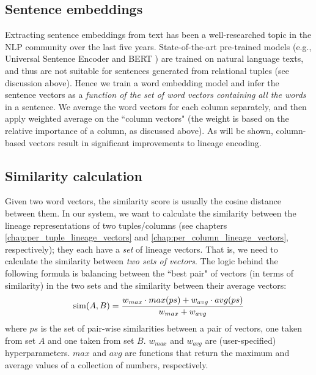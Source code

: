 \subsection{Sentence embeddings} Extracting sentence embeddings from text has been a well-researched topic in the NLP community over the last five years. State-of-the-art pre-trained models (e.g., Universal Sentence Encoder \cite{Cer2018UniversalSE, use_github} and BERT \cite{devlin2018bert}) are trained on natural language texts, and thus are not suitable for sentences generated from relational tuples (see discussion above). Hence we train a word embedding model and infer the sentence vectors as a \textit{function of the set of word vectors containing all the words} in a sentence. We average the word vectors for each column separately, and then apply weighted average on the ``column vectors" (the weight is based on the relative importance of a column, as discussed above). As will be shown, column-based vectors result in significant improvements to lineage encoding.
\subsection{Similarity calculation} Given two word vectors, the similarity score is usually the cosine distance between them. In our system, we want to calculate the similarity between the lineage representations of two tuples/columns (see chapters \ref{chap:per_tuple_lineage_vectors} and \ref{chap:per_column_lineage_vectors}, respectively); they each have a \textit{set} of lineage vectors. That is, we need to calculate the similarity between \textit{two sets of vectors}\footnotemark. The logic behind the following formula is balancing between the ``best pair" of vectors (in terms of similarity) in the two sets and the similarity between their average vectors:\\
\begin{equation*}
    \operatorname{sim}(A, B) = \frac{w_{max} \cdot max(ps) + w_{avg} \cdot avg(ps)}
    {w_{max} + w_{avg}}\\
\end{equation*}
where $ps$ is the set of pair-wise similarities between a pair of vectors, one taken from set $A$ and one taken from set $B$. $w_{max}$ and $w_{avg}$ are (user-specified) hyperparameters. $max$ and $avg$ are functions that return the maximum and average values of a collection of numbers, respectively\footnotemark.


